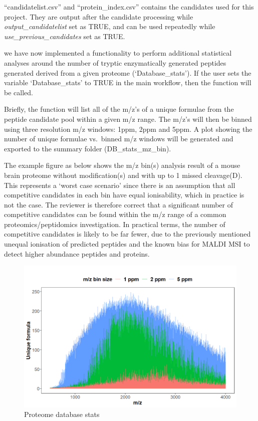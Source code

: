 \documentclass[
]{article}
\begin{document}
``candidatelist.csv'' and ``protein\_index.csv'' contains the candidates
used for this project. They are output after the candidate processing
while \emph{output\_candidatelist} set as TRUE, and can be used
repeatedly while \emph{use\_previous\_candidates} set as TRUE.

we have now implemented a functionality to perform additional
statistical analyses around the number of tryptic enzymatically
generated peptides generated derived from a given proteome
(`Database\_stats'). If the user sets the variable `Database\_stats' to
TRUE in the main workflow, then the function will be called.

Briefly, the function will list all of the m/z's of a unique formulae
from the peptide candidate pool within a given m/z range. The m/z's will
then be binned using three resolution m/z windows: 1ppm, 2ppm and 5ppm.
A plot showing the number of unique formulae vs.~binned m/z windows will
be generated and exported to the summary folder (DB\_stats\_mz\_bin).

The example figure as below shows the m/z bin(s) analysis result of a
mouse brain proteome without modification(s) and with up to 1 missed
cleavage(D). This represents a `worst case scenario' since there is an
assumption that all competitive candidates in each bin have equal
ionisability, which in practice is not the case. The reviewer is
therefore correct that a significant number of competitive candidates
can be found within the m/z range of a common proteomics/peptidomics
investigation. In practical terms, the number of competitive candidates
is likely to be far fewer, due to the previously mentioned unequal
ionisation of predicted peptides and the known bias for MALDI MSI to
detect higher abundance peptides and proteins.

\begin{figure}
\centering
\includegraphics{Resource/DB_stats_bin_mz_ppm.png}
\caption{Proteome database stats}
\end{figure}
\end{document}

